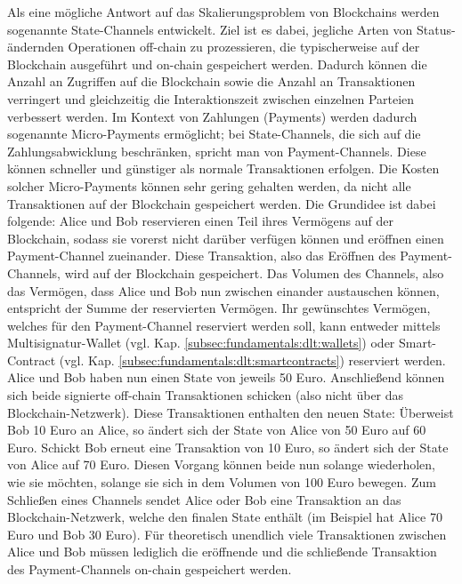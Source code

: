 Als eine mögliche Antwort auf das Skalierungsproblem von Blockchains werden sogenannte State-Channels entwickelt. Ziel ist es dabei, jegliche Arten von Status-ändernden Operationen off-chain zu prozessieren, die typischerweise auf der Blockchain ausgeführt und on-chain gespeichert werden. Dadurch können die Anzahl an Zugriffen auf die Blockchain sowie die Anzahl an Transaktionen verringert und gleichzeitig die Interaktionszeit zwischen einzelnen Parteien verbessert werden. Im Kontext von Zahlungen (Payments) werden dadurch sogenannte Micro-Payments ermöglicht; bei State-Channels, die sich auf die Zahlungsabwicklung beschränken, spricht man von Payment-Channels. Diese können schneller und günstiger als normale Transaktionen erfolgen. Die Kosten solcher Micro-Payments können sehr gering gehalten werden, da nicht alle Transaktionen auf der Blockchain gespeichert werden. Die Grundidee ist dabei folgende: Alice und Bob reservieren einen Teil ihres Vermögens auf der Blockchain, sodass sie vorerst nicht darüber verfügen können und eröffnen einen Payment-Channel zueinander. Diese Transaktion, also das Eröffnen des Payment-Channels, wird auf der Blockchain gespeichert. Das Volumen des Channels, also das Vermögen, dass Alice und Bob nun zwischen einander austauschen können, entspricht der Summe der reservierten Vermögen. Ihr gewünschtes Vermögen, welches für den Payment-Channel reserviert werden soll, kann entweder mittels Multisignatur-Wallet (vgl. Kap. \ref{subsec:fundamentals:dlt:wallets}) oder Smart-Contract (vgl. Kap. \ref{subsec:fundamentals:dlt:smartcontracts}) reserviert werden. Alice und Bob haben nun einen State von jeweils 50 Euro. Anschließend können sich beide signierte off-chain Transaktionen schicken (also nicht über das Blockchain-Netzwerk). Diese Transaktionen enthalten den neuen State: Überweist Bob 10 Euro an Alice, so ändert sich der State von Alice von 50 Euro auf 60 Euro. Schickt Bob erneut eine Transaktion von 10 Euro, so ändert sich der State von Alice auf 70 Euro. Diesen Vorgang können beide nun solange wiederholen, wie sie möchten, solange sie sich in dem Volumen von 100 Euro bewegen. Zum Schließen eines Channels sendet Alice oder Bob eine Transaktion an das Blockchain-Netzwerk, welche den finalen State enthält (im Beispiel hat Alice 70 Euro und Bob 30 Euro). Für theoretisch unendlich viele Transaktionen zwischen Alice und Bob müssen lediglich die eröffnende und die schließende Transaktion des Payment-Channels on-chain gespeichert werden.\\
